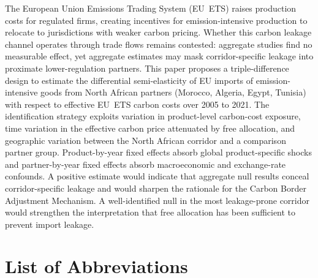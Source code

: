 \documentclass[12pt,a4paper]{article}
\numberwithin{equation}{section}
\begin{document}
The European Union Emissions Trading System (EU~ETS) raises production costs for regulated firms, creating incentives for emission-intensive production to relocate to jurisdictions with weaker carbon pricing. Whether this carbon leakage channel operates through trade flows remains contested: aggregate studies find no measurable effect, yet aggregate estimates may mask corridor-specific leakage into proximate lower-regulation partners. This paper proposes a triple-difference design to estimate the differential semi-elasticity of EU imports of emission-intensive goods from North African partners (Morocco, Algeria, Egypt, Tunisia) with respect to effective EU~ETS carbon costs over 2005 to 2021. The identification strategy exploits variation in product-level carbon-cost exposure, time variation in the effective carbon price attenuated by free allocation, and geographic variation between the North African corridor and a comparison partner group. Product-by-year fixed effects absorb global product-specific shocks and partner-by-year fixed effects absorb macroeconomic and exchange-rate confounds. A positive estimate would indicate that aggregate null results conceal corridor-specific leakage and would sharpen the rationale for the Carbon Border Adjustment Mechanism. A well-identified null in the most leakage-prone corridor would strengthen the interpretation that free allocation has been sufficient to prevent import leakage.

\newpage
\tableofcontents

\newpage
\listoffigures
{}

\listoftables
{}

\newpage
\section*{List of Abbreviations}
\end{document}
